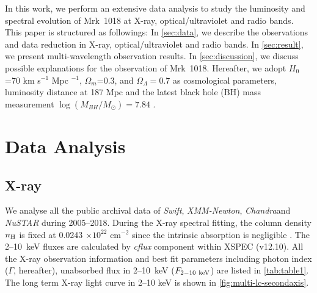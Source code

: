 \documentclass[twocolumn]{aastex63}
\newcommand{\xmm}{{\em XMM-Newton}}
\newcommand{\nustar}{{\em NuSTAR }}
\newcommand{\chandra}{{\em Chandra}}
\newcommand{\swift}{{\em Swift}}
\begin{document}

In this work, we perform an extensive data analysis to study the luminosity and spectral evolution of Mrk~1018 at X-ray, optical/ultraviolet and radio bands. This paper is structured as followings: In \autoref{sec:data}, we describe the observations and data reduction in X-ray, optical/ultraviolet and radio bands. In \autoref{sec:result}, we present multi-wavelength observation results. In \autoref{sec:discussion}, we discuss possible explanations for the observation of Mrk~1018. Hereafter, we adopt $H_0$=70 km s$^{-1}$ Mpc $^{-1}$, $\Omega_{m}$=0.3, and $\Omega_{\Lambda}=0.7 $ as cosmological parameters, luminosity distance at 187 Mpc and the latest black hole (BH) mass measurement $\log(M_{BH}/M_{\odot})=7.84$ \citep{2017MNRAS.472.3492E,2018MNRAS.480.3898N}. 


\section{Data Analysis}\label{sec:data}
\subsection{X-ray}
We analyse all the public archival data of \swift, \xmm, \chandra and \nustar during 2005--2018. During the X-ray spectral fitting, the column density $n_{\rm{H}}$ is fixed at 0.0243 $\times 10^{22}$ cm$^{-2}$ since the intrinsic absorption is negligible \citep[see ][]{2016A&A...593L...9H}. The 2--10~keV fluxes are calculated by {\it cflux} component within {\scriptsize XSPEC} (v12.10). All the X-ray observation information and best fit parameters including photon index ($\Gamma$, hereafter), unabsorbed flux in 2--10~keV ($F_{\rm{2-10~keV}}$) are listed in \autoref{tab:table1}. The long term X-ray light curve in 2--10 keV is shown in \autoref{fig:multi-lc-secondaxis}.
\end{document}
